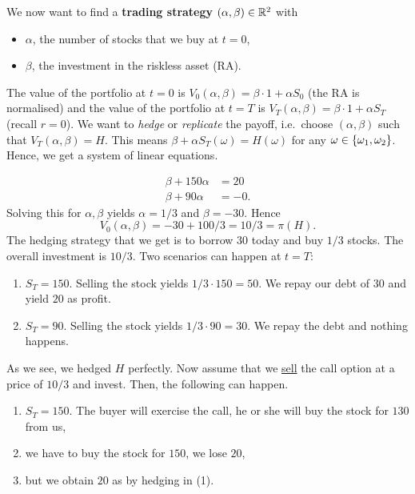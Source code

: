 \documentclass[12pt]{amsart}
\begin{document}
We now want to find a \textbf{trading strategy} \((\alpha, \beta) \in \mathbb{R}^2\) with
\begin{itemize}
    \item \(\alpha\), the number of stocks that we buy at \(t=0\),
    \item \(\beta\), the investment in the riskless asset (RA).
\end{itemize}

The value of the portfolio at \(t=0\) is \(V_0(\alpha, \beta) = \beta \cdot 1 + \alpha S_0\) (the RA is normalised) and the value of the portfolio at \(t=T\) is \(V_T(\alpha, \beta) = \beta \cdot 1 + \alpha S_T\) (recall \(r=0\)). We want to \emph{hedge} or \emph{replicate} the payoff, i.e.\ choose \((\alpha, \beta)\) such that \(V_T(\alpha, \beta) = H\). This means \(\beta+\alpha S_T(\omega) = H(\omega)\) for any \(\omega \in \left\{ \omega_1, \omega_2 \right\}\). Hence, we get a system of linear equations.

\begin{align*}
    \beta + 150\alpha &= 20\\
    \beta + 90 \alpha &= -0.
\end{align*}
Solving this for \(\alpha, \beta\) yields \(\alpha=1/3\) and \(\beta=-30\). Hence \[
    V_0(\alpha, \beta) = -30 + 100/3 = 10/3 = \pi(H).
\]
The hedging strategy that we get is to borrow \(30\) today and buy \(1/3\) stocks. The overall investment is \(10/3\). Two scenarios can happen at \(t=T\):
\begin{enumerate}
    \item \(S_T=150\). Selling the stock yields \(1/3 \cdot 150 = 50\). We repay our debt of \(30\) and yield \(20\) as profit.
    \item \(S_T=90\). Selling the stock yields \(1/3 \cdot 90 = 30\). We repay the debt and nothing happens.
\end{enumerate}
As we see, we hedged \(H\) perfectly. Now assume that we \underline{sell} the call option at a price of \(10/3\) and invest. Then, the following can happen.

\begin{enumerate}
    \item \(S_T=150\). The buyer will exercise the call, he or she will buy the stock for \(130\) from us,
    \item we have to buy the stock for \(150\), we lose \(20\),
    \item but we obtain \(20\) as by hedging in (1).
\end{enumerate}
\end{document}
